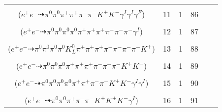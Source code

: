 \documentclass[landscape]{article}
\newcounter{rownumbers}
\newcommand\rn{\stepcounter{rownumbers}\arabic{rownumbers}}
\newcommand{\EOL}{\\} %
\newcommand{\topoTags}[1]{#1} %
\begin{document}
\begin{longtable}{clcccc}
\rn & \makecell[l]{ $ 
e^{+} e^{-} \rightarrow \pi^{0} \rho^{0} \pi^{-} \rho^{+} K^{+} K^{-} \gamma^{I} \gamma^{I} ,
\rho^{0} \rightarrow \pi^{+} \pi^{-} ,
\rho^{+} \rightarrow \pi^{0} \pi^{+} \gamma^{F} 
$ \\ ($
e^{+} e^{-} \dashrightarrow \pi^{0} \pi^{0} \pi^{+} \pi^{+} \pi^{-} \pi^{-} K^{+} K^{-} \gamma^{I} \gamma^{I} \gamma^{F} 
$) } & \topoTags{11 & }1 & 86 \EOL

\rn & \makecell[l]{ $ 
e^{+} e^{-} \rightarrow \pi^{0} \pi^{0} \rho^{0} \pi^{-} \pi^{-} \rho^{+} \rho^{+} \gamma^{I} ,
\rho^{0} \rightarrow \pi^{+} \pi^{-} ,
\rho^{+} \rightarrow \pi^{0} \pi^{+} ,
\rho^{+} \rightarrow \pi^{0} \pi^{+} 
$ \\ ($
e^{+} e^{-} \dashrightarrow \pi^{0} \pi^{0} \pi^{0} \pi^{0} \pi^{+} \pi^{+} \pi^{+} \pi^{-} \pi^{-} \pi^{-} \gamma^{I} 
$) } & \topoTags{12 & }1 & 87 \EOL

\rn & \makecell[l]{ $ 
e^{+} e^{-} \rightarrow \pi^{0} \pi^{0} \pi^{0} \pi^{+} \pi^{+} \pi^{-} \pi^{-} \omega \bar{K}^{0} K^{*} ,
\omega \rightarrow \pi^{0} \pi^{+} \pi^{-} ,
\bar{K}^{0} \rightarrow K_{L}^{0} ,
K^{*} \rightarrow \pi^{-} K^{+} 
$ \\ ($
e^{+} e^{-} \dashrightarrow \pi^{0} \pi^{0} \pi^{0} \pi^{0} K_{L}^{0} \pi^{+} \pi^{+} \pi^{+} \pi^{-} \pi^{-} \pi^{-} \pi^{-} K^{+} 
$) } & \topoTags{13 & }1 & 88 \EOL

\rn & \makecell[l]{ $ 
e^{+} e^{-} \rightarrow \pi^{0} \pi^{0} \pi^{+} \pi^{+} \pi^{-} \pi^{-} \rho^{-} \bar{K}^{*} K^{+} ,
\rho^{-} \rightarrow \pi^{0} \pi^{-} ,
\bar{K}^{*} \rightarrow \pi^{+} K^{-} 
$ \\ ($
e^{+} e^{-} \dashrightarrow \pi^{0} \pi^{0} \pi^{0} \pi^{+} \pi^{+} \pi^{+} \pi^{-} \pi^{-} \pi^{-} K^{+} K^{-} 
$) } & \topoTags{14 & }1 & 89 \EOL

\rn & \makecell[l]{ $ 
e^{+} e^{-} \rightarrow \pi^{0} \pi^{-} \rho^{+} \omega K^{+} K^{*-} \gamma^{I} \gamma^{I} ,
\rho^{+} \rightarrow \pi^{0} \pi^{+} ,
\omega \rightarrow \pi^{0} \pi^{+} \pi^{-} ,
K^{*-} \rightarrow \pi^{0} K^{-} 
$ \\ ($
e^{+} e^{-} \dashrightarrow \pi^{0} \pi^{0} \pi^{0} \pi^{0} \pi^{+} \pi^{+} \pi^{-} \pi^{-} K^{+} K^{-} \gamma^{I} \gamma^{I} 
$) } & \topoTags{15 & }1 & 90 \EOL

\rn & \makecell[l]{ $ 
e^{+} e^{-} \rightarrow \pi^{0} \pi^{0} \pi^{-} \bar{K}^{0} K^{+} \phi \gamma^{I} ,
\bar{K}^{0} \rightarrow K_{S}^{0} ,
\phi \rightarrow K^{+} K^{-} ,
K_{S}^{0} \rightarrow \pi^{+} \pi^{-} 
$ \\ ($
e^{+} e^{-} \dashrightarrow \pi^{0} \pi^{0} \pi^{+} \pi^{-} \pi^{-} K^{+} K^{+} K^{-} \gamma^{I} 
$) } & \topoTags{16 & }1 & 91 \EOL


\end{longtable}
\end{document}
